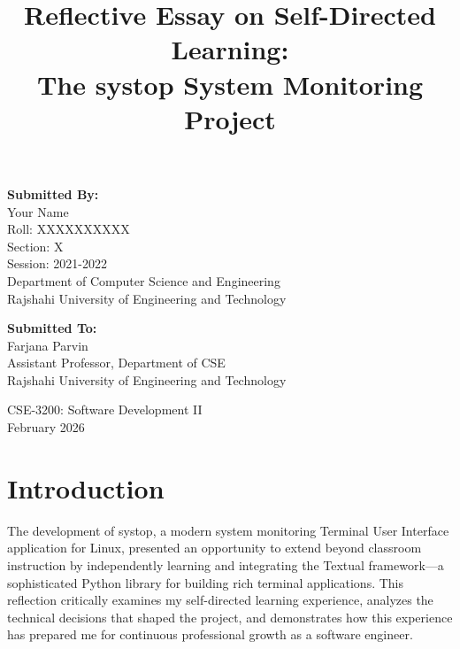 \documentclass[12pt,a4paper]{article}
\title{\textbf{Reflective Essay on Self-Directed Learning:\\The systop System Monitoring Project}}
\author{}
\date{}
\begin{document}
\maketitle
\thispagestyle{empty}

\vspace{-2cm}

\begin{center}
\textbf{Submitted By:}\\
\vspace{0.3cm}
Your Name\\
Roll: XXXXXXXXXX\\
Section: X\\
Session: 2021-2022\\
\vspace{0.5cm}
Department of Computer Science and Engineering\\
Rajshahi University of Engineering and Technology\\
\vspace{1.5cm}

\textbf{Submitted To:}\\
\vspace{0.3cm}
Farjana Parvin\\
Assistant Professor, Department of CSE\\
Rajshahi University of Engineering and Technology\\
\vspace{1cm}

CSE-3200: Software Development II\\
\vspace{0.5cm}
February 2026
\end{center}

\newpage

\tableofcontents
\thispagestyle{empty}

\newpage
\setcounter{page}{1}

\section*{Introduction}

The development of systop, a modern system monitoring Terminal User Interface application for Linux, presented an opportunity to extend beyond classroom instruction by independently learning and integrating the Textual framework—a sophisticated Python library for building rich terminal applications. This reflection critically examines my self-directed learning experience, analyzes the technical decisions that shaped the project, and demonstrates how this experience has prepared me for continuous professional growth as a software engineer.
\end{document}
